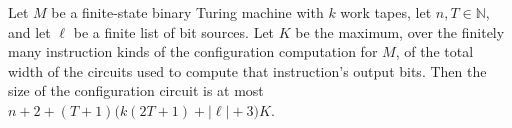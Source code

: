 \begin{theorem}
\label{Complexity.cfgCircuit_size_le}
\leanok
{}
Let $M$ be a finite-state binary Turing machine with $k$ work tapes, let
$n,T\in\mathbb{N}$, and let $\ell$ be a finite list of bit sources. Let $K$ be the
maximum, over the finitely many instruction kinds of the configuration computation for
$M$, of the total width of the circuits used to compute that instruction's output bits.
Then the size of the configuration circuit is at most
$n+2+(T+1)\bigl(k(2T+1)+|\ell|+3\bigr)K$.
\end{theorem}
